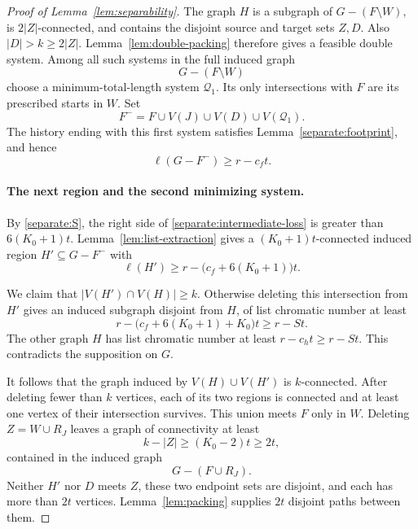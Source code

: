 \begin{proof}[Proof of Lemma~\ref{lem:separability}]
The graph \(H\) is a subgraph of \(G-(F\setminus W)\),
is \(2|Z|\)-connected, and contains the disjoint source and target
sets \(Z,D\). Also \(|D|>k\ge2|Z|\).
Lemma~\ref{lem:double-packing} therefore gives a feasible double
system. Among all such systems in the full induced graph
\begin{equation}
 \label{separate:first-domain}
 G-(F\setminus W)
\end{equation}
choose a minimum-total-length system \(\mathcal Q_1\).
Its only intersections with \(F\) are its prescribed starts in \(W\).
Set
\[
 F^-=F\cup V(J)\cup V(D)\cup V(\mathcal Q_1).
\]
The history ending with this first system satisfies
Lemma~\ref{separate:footprint}, and hence
\begin{equation}
 \label{separate:intermediate-loss}
 \ell(G-F^-)\ge r-c_ft.
\end{equation}

\paragraph{The next region and the second minimizing system.}
By \eqref{separate:S}, the right side of
\eqref{separate:intermediate-loss} is greater than
\(6(K_0+1)t\).
Lemma~\ref{lem:list-extraction} gives a
\((K_0+1)t\)-connected induced region \(H'\subseteq G-F^-\)
with
\begin{equation}
 \label{separate:new-region-list}
 \ell(H')\ge r-\bigl(c_f+6(K_0+1)\bigr)t.
\end{equation}

We claim that \(|V(H')\cap V(H)|\ge k\).
Otherwise deleting this intersection from \(H'\) gives an induced
subgraph disjoint from \(H\), of list chromatic number at least
\[
 r-\bigl(c_f+6(K_0+1)+K_0\bigr)t\ge r-St.
\]
The other graph \(H\) has list chromatic number at least
\(r-c_ht\ge r-St\). This contradicts the supposition on \(G\).

It follows that the graph induced by \(V(H)\cup V(H')\) is
\(k\)-connected. After deleting fewer than \(k\) vertices, each
of its two regions is connected and at least one vertex of their
intersection survives. This union meets \(F\) only in \(W\).
Deleting \(Z=W\cup R_J\) leaves a graph of connectivity at least
\[
 k-|Z|\ge(K_0-2)t\ge2t,
\]
contained in the induced graph
\begin{equation}
 \label{separate:second-domain}
 G-(F\cup R_J).
\end{equation}
Neither \(H'\) nor \(D\) meets \(Z\), these two endpoint sets are
disjoint, and each has more than \(2t\) vertices.
Lemma~\ref{lem:packing} supplies \(2t\) disjoint paths between them.


\end{proof}
